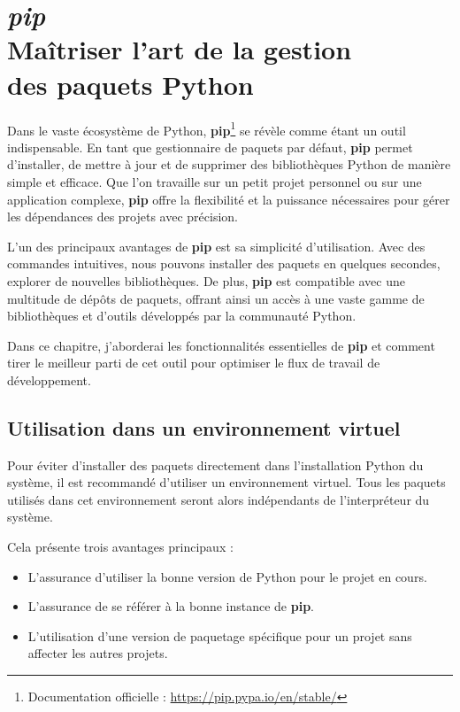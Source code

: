 \chapter[\textit{pip}]{\textit{pip} \\ Maîtriser l'art de la gestion \\ des paquets Python}

\bigskip

Dans le vaste écosystème de Python, \textbf{pip}\footnote{Documentation officielle : \url{https://pip.pypa.io/en/stable/}} se révèle comme étant un outil indispensable. En tant que gestionnaire de paquets par défaut, \textbf{pip} permet d'installer, de mettre à jour et de supprimer des bibliothèques Python de manière simple et efficace. Que l'on travaille sur un petit projet personnel ou sur une application complexe, \textbf{pip} offre la flexibilité et la puissance nécessaires pour gérer les dépendances des projets avec précision.

L'un des principaux avantages de \textbf{pip} est sa simplicité d'utilisation. Avec des commandes intuitives, nous pouvons installer des paquets en quelques secondes, explorer de nouvelles bibliothèques. De plus, \textbf{pip} est compatible avec une multitude de dépôts de paquets, offrant ainsi un accès à une vaste gamme de bibliothèques et d'outils développés par la communauté Python.

Dans ce chapitre, j'aborderai les fonctionnalités essentielles de \textbf{pip} et comment tirer le meilleur parti de cet outil pour optimiser le flux de travail de développement. 

\section{Utilisation dans un environnement virtuel}
Pour éviter d'installer des paquets directement dans l'installation Python du système, il est recommandé d'utiliser un environnement virtuel. Tous les paquets utilisés dans cet environnement seront alors indépendants de l'interpréteur du système. 

Cela présente trois avantages principaux :
\begin{itemize}
    \item L'assurance d'utiliser la bonne version de Python pour le projet en cours.
    \item L'assurance de se référer à la bonne instance de \textbf{pip}.
    \item L'utilisation d'une version de paquetage spécifique pour un projet sans affecter les autres projets.
\end{itemize}

